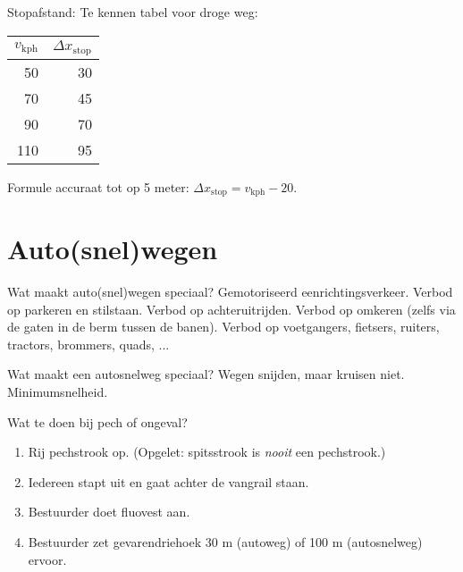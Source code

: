 \begin{outline}
		\2 Stopafstand:
			\3 Te kennen tabel voor droge weg:
			\begin{center}
			\begin{tabular}{rr}
				$v_\textrm{kph}$ & $\Delta x_\textrm{stop}$ \\\hline
				50 & 30 \\
				70 & 45 \\
				90 & 70 \\
				110 & 95 \\
			\end{tabular}
			\end{center}
			
			\3 Formule accuraat tot op 5 meter: $\Delta x_\textrm{stop} = v_\textrm{kph} - 20$.
\end{outline}

\section{Auto(snel)wegen}
\begin{outline}
\1 Wat maakt auto(snel)wegen speciaal? Gemotoriseerd eenrichtingsverkeer.
	\2 Verbod op parkeren en stilstaan.
	\2 Verbod op achteruitrijden.
	\2 Verbod op omkeren (zelfs via de gaten in de berm tussen de banen).
	\2 Verbod op voetgangers, fietsers, ruiters, tractors, brommers, quads, ...

\1 Wat maakt een autosnelweg speciaal?
	\2 Wegen snijden, maar kruisen niet.
	\2 Minimumsnelheid.
	
\1 Wat te doen bij pech of ongeval?
\begin{enumerate}
	\item Rij pechstrook op. (Opgelet: spitsstrook is \emph{nooit} een pechstrook.)
	\item Iedereen stapt uit en gaat achter de vangrail staan.
	\item Bestuurder doet fluovest aan.
	\item Bestuurder zet gevarendriehoek 30 m (autoweg) of 100 m (autosnelweg) ervoor.
\end{enumerate}
\end{outline}

